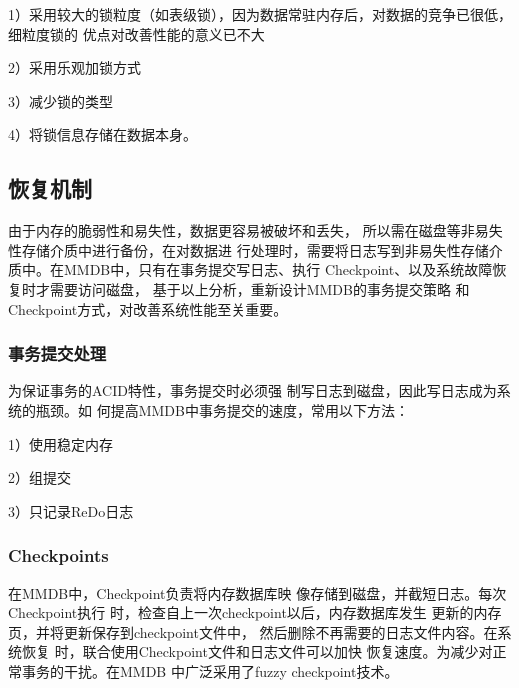 \documentclass[literaturereview]{zjutreport}
\begin{document}
1）采用较大的锁粒度（如表级锁），因为数据常驻内存后，对数据的竞争已很低，细粒度锁的
优点对改善性能的意义已不大

2）采用乐观加锁方式

3）减少锁的类型

4）将锁信息存储在数据本身。

\subsection{恢复机制}
由于内存的脆弱性和易失性，数据更容易被破坏和丢失，
所以需在磁盘等非易失性存储介质中进行备份，在对数据进
行处理时，需要将日志写到非易失性存储介质中。在MMDB中，只有在事务提交写日志、执行
Checkpoint、以及系统故障恢复时才需要访问磁盘，
基于以上分析，重新设计MMDB的事务提交策略
和Checkpoint方式，对改善系统性能至关重要。

\subsubsection{事务提交处理}
为保证事务的ACID特性，事务提交时必须强
制写日志到磁盘，因此写日志成为系统的瓶颈。如
何提高MMDB中事务提交的速度，常用以下方法：

1）使用稳定内存

2）组提交

3）只记录ReDo日志

\subsubsection{Checkpoints}
在MMDB中，Checkpoint负责将内存数据库映
像存储到磁盘，并截短日志。每次Checkpoint执行
时，检查自上一次checkpoint以后，内存数据库发生
更新的内存页，并将更新保存到checkpoint文件中，
然后删除不再需要的日志文件内容。在系统恢复
时，联合使用Checkpoint文件和日志文件可以加快
恢复速度。为减少对正常事务的干扰。在MMDB
中广泛采用了fuzzy checkpoint技术。

\backmatter
\endgroup %
\clearpage %

\nocite{*}                                   %

\end{document}
